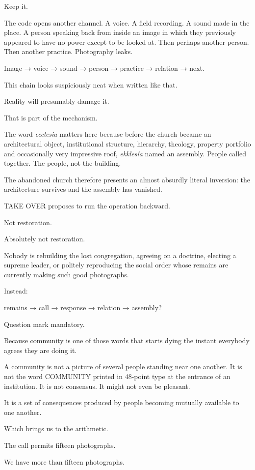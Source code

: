 Keep it.

The code opens another channel. A voice. A field recording. A sound made
in the place. A person speaking back from inside an image in which they
previously appeared to have no power except to be looked at. Then
perhaps another person. Then another practice. Photography leaks.

Image → voice → sound → person → practice → relation → next.

This chain looks suspiciously neat when written like that.

Reality will presumably damage it.

That is part of the mechanism.

The word \emph{ecclesia} matters here because before the church became
an architectural object, institutional structure, hierarchy, theology,
property portfolio and occasionally very impressive roof,
\emph{ekklesía} named an assembly. People called together. The people,
not the building.

The abandoned church therefore presents an almost absurdly literal
inversion: the architecture survives and the assembly has vanished.

TAKE OVER proposes to run the operation backward.

Not restoration.

Absolutely not restoration.

Nobody is rebuilding the lost congregation, agreeing on a doctrine,
electing a supreme leader, or politely reproducing the social order
whose remains are currently making such good photographs.

Instead:

remains → call → response → relation → assembly?

Question mark mandatory.

Because community is one of those words that starts dying the instant
everybody agrees they are doing it.

A community is not a picture of several people standing near one
another. It is not the word COMMUNITY printed in 48-point type at the
entrance of an institution. It is not consensus. It might not even be
pleasant.

It is a set of consequences produced by people becoming mutually
available to one another.

Which brings us to the arithmetic.

The call permits fifteen photographs.

We have more than fifteen photographs.

